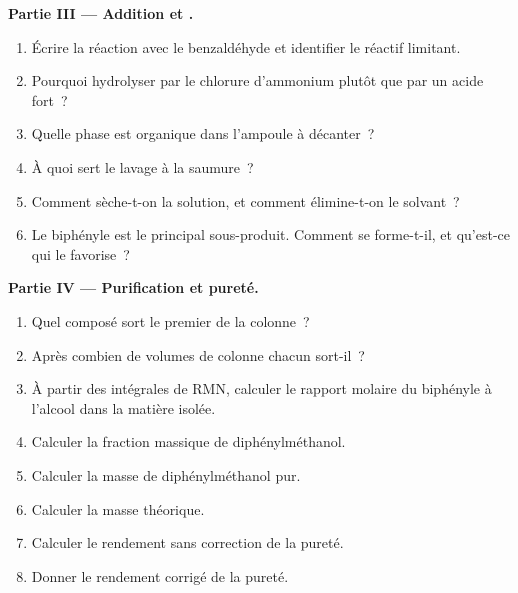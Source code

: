 \begin{problem}
\medskip
\noindent\textbf{Partie III --- Addition et .}
\begin{enumerate}[resume]
  \item Écrire la réaction avec le benzaldéhyde et identifier le réactif limitant.
  \item Pourquoi hydrolyser par le chlorure d'ammonium plutôt que par un acide fort~?
  \item Quelle phase est organique dans l'ampoule à décanter~?
  \item À quoi sert le lavage à la saumure~?
  \item Comment sèche-t-on la solution, et comment élimine-t-on le solvant~?
  \item Le biphényle est le principal sous-produit. Comment se forme-t-il, et qu'est-ce qui le favorise~?
\end{enumerate}

\medskip
\noindent\textbf{Partie IV --- Purification et pureté.}
\begin{enumerate}[resume]
  \item Quel composé sort le premier de la colonne~?
  \item Après combien de volumes de colonne chacun sort-il~?
  \item À partir des intégrales de RMN, calculer le rapport molaire du biphényle à l'alcool dans la
        matière isolée.
  \item Calculer la fraction massique de diphénylméthanol.
  \item Calculer la masse de diphénylméthanol pur.
  \item Calculer la masse théorique.
  \item Calculer le rendement sans correction de la pureté.
  \item Donner le rendement corrigé de la pureté.
\end{enumerate}
\end{problem}
